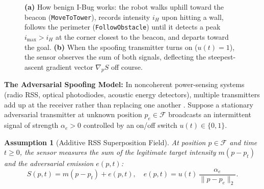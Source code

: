 \documentclass[11pt, a4paper]{article}
\newtheorem{assumption}{Assumption}
\begin{document}
\begin{figure}[H]
\caption{\textbf{(a)} How benign I-Bug works: the robot walks uphill toward the beacon (\texttt{MoveToTower}), records intensity $i_H$ upon hitting a wall, follows the perimeter (\texttt{FollowObstacle}) until it detects a peak $i_{\max} > i_H$ at the corner closest to the beacon, and departs toward the goal. \textbf{(b)} When the spoofing transmitter turns on ($u(t)=1$), the sensor observes the sum of both signals, deflecting the steepest-ascent gradient vector $\nabla_p S$ off course.}
\label{fig:ibug_and_spoof}
\end{figure}

\noindent\textbf{The Adversarial Spoofing Model:}
In noncoherent power-sensing systems (radio RSS, optical photodiodes, acoustic energy detectors), multiple transmitters add up at the receiver rather than replacing one another \cite{kerns2014unmanned, psiaki2016gnss}. Suppose a stationary adversarial transmitter at unknown position $p_e \in \mathcal{F}$ broadcasts an intermittent signal of strength $\alpha_e > 0$ controlled by an on/off switch $u(t) \in \{0, 1\}$.

\begin{assumption}[Additive RSS Superposition Field]
\label{assump:superposition}
At position $p \in \mathcal{F}$ and time $t \ge 0$, the sensor measures the sum of the legitimate target intensity $m(p - p_t)$ and the adversarial emission $e(p, t)$:
\begin{equation}
    S(p, t) = m(p - p_t) + e(p, t), \quad e(p, t) = u(t)\,\frac{\alpha_e}{\|p - p_e\|_2}.
    \label{eq:superposition}
\end{equation}
\end{assumption}
\end{document}

